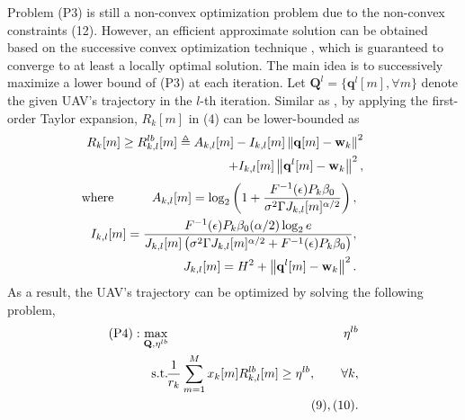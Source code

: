 \documentclass[journal]{IEEEtran}
\newcommand{\norm}[1]{\left\lVert#1\right\rVert}
\begin{document}
Problem (P3) is still a non-convex optimization problem due to the
non-convex constraints (12). However, an efficient approximate solution can be obtained based on the successive convex optimization technique \cite{YZeng}, which is guaranteed to converge to at least a locally optimal solution.
The main idea is to successively maximize a lower bound
of (P3) at each iteration. Let $\mathbf{Q}^{l}=\{\mathbf{q}^{l}[m], \forall m\}$ denote the given UAV's trajectory in the $l$-th iteration. Similar as \cite{YZeng}, by applying the first-order Taylor expansion, $R_k[m]$ in (4) can be lower-bounded as
\begin{eqnarray}
&&\hspace{-8mm}R_k[m]\geq R_{k,l}^{lb}[m]\triangleq A_{k,l}[m]-I_{k,l}[m]\norm{\mathbf{q}[m]-\mathbf{w}_k}^2\nonumber\\
&&\hspace{22mm} +I_{k,l}[m]\norm{\mathbf{q}^{l}[m]-\mathbf{w}_k}^2,
\end{eqnarray}
\begin{eqnarray}
\hspace{-8mm}\text{where}&&\hspace{-5mm}A_{k,l}[m]=\log_{2}\left(1+\frac{F^{-1}(\epsilon)P_k\beta_0}{\sigma^2\Gamma J_{k,l}[m]^{\alpha/2}}\right),\\
&&\hspace{-10mm}I_{k,l}[m]=\frac{F^{-1}(\epsilon)P_k\beta_0(\alpha/2)\log_{2}{e}}{J_{k,l}[m]\left(\sigma^2\Gamma J_{k,l}[m]^{\alpha/2}+F^{-1}(\epsilon)P_k\beta_0\right)},\\
&&\hspace{-10mm}J_{k,l}[m]=H^2+\norm{\mathbf{q}^{l}[m]-\mathbf{w}_k}^2.
\end{eqnarray}
As a result, the UAV's trajectory can be optimized by solving the following problem,
\begin{eqnarray}
\text{(P4)}:\max\limits_{\mathbf{Q},\eta^{lb}}&&\hspace{-4mm}  \eta^{lb} \nonumber\\
\text{s.t.} &&\hspace{-4mm} \frac{1}{r_k}\sum_{m=1}^{M}x_k[m]R_{k,l}^{lb}[m]\geq \eta^{lb} , \quad\quad\forall k,\\
&&\hspace{-4mm}(9),(10).\nonumber
\end{eqnarray}
\end{document}
